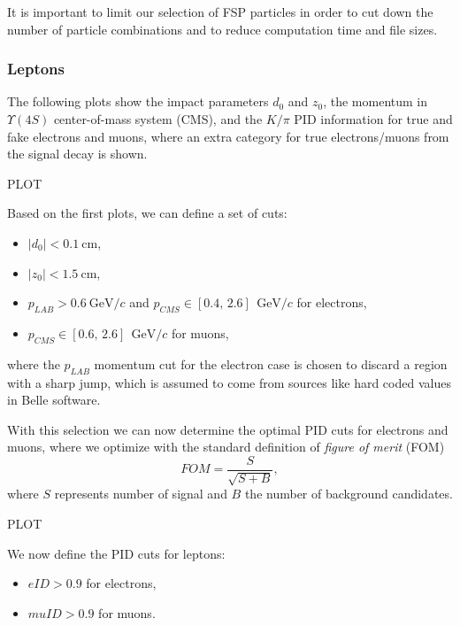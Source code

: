 \documentclass[oneside,a4paper,openany,12pt]{scrbook}
\newcommand {\e}[1]{\mathrm{~#1}}
\begin{document}
It is important to limit our selection of FSP particles in order to cut down the number of particle combinations and to reduce computation time and file sizes.

\subsubsection{Leptons}

The following plots show the impact parameters $d_0$ and $z_0$, the momentum in  $\Upsilon(4S)$ center-of-mass system (CMS), and the $K/\pi$ PID information for true and fake electrons and muons, where an extra category for true electrons/muons from the signal decay is shown.

\begin{center}
PLOT
\end{center}

Based on the first plots, we can define a set of cuts:
\begin{itemize}
\item $\vert d_0 \vert < 0.1\e{cm}$,
\item $\vert z_0 \vert < 1.5\e{cm}$,
\item $p_{LAB} > 0.6\e{GeV}/c$ and $p_{CMS} \in [0.4,\,2.6]~\e{GeV}/c$ for electrons,
\item $p_{CMS} \in [0.6,\,2.6]~\e{GeV}/c$ for muons,
\end{itemize}

where the $p_{LAB}$ momentum cut for the electron case is chosen to discard a region with a sharp jump, which is assumed to come from sources like hard coded values in Belle software.

With this selection we can now determine the optimal PID cuts for electrons and muons, where we optimize with the standard definition of \textit{figure of merit} (FOM)
\begin{equation}
\label{eq:fom}
FOM = \frac{S}{\sqrt{S+B}},
\end{equation} 
where $S$ represents number of signal and $B$ the number of background candidates.

\begin{center}
PLOT
\end{center}

We now define the PID cuts for leptons:
\begin{itemize}
\item $eID > 0.9$ for electrons,
\item $muID > 0.9$ for muons.
\end{itemize}
\end{document}
